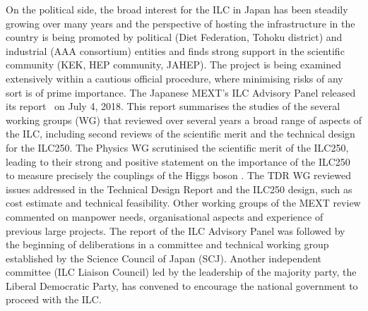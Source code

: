 \documentclass[%
 reprint,
 amsmath,amssymb,
 aps,
]{revtex4-1}
\newcommand{\todo}[1]{\textcolor{red}{{#1}}}
\begin{document}
On the political side, the broad interest for the ILC in Japan has been steadily growing over many years and the perspective of hosting the infrastructure in the country is being promoted by political (Diet Federation, Tohoku district) and industrial (AAA consortium) entities and finds strong support in the scientific community (KEK, HEP community, JAHEP). The project is being examined extensively within a cautious official procedure, where minimising risks of any sort is of prime importance. The Japanese MEXT's ILC Advisory Panel released its report~\cite{AdvPanel} on July 4, 2018.  This report summarises the studies of the several working groups (WG) that reviewed over several years a broad range of aspects of the ILC, including second reviews of the scientific merit and the technical design for the ILC250. 
The  Physics WG scrutinised the scientific merit of the ILC250, leading to their strong and positive statement on the importance of the ILC250 to measure precisely the couplings of the Higgs boson \cite{AdvPanel}.
The TDR WG reviewed issues addressed in the Technical Design Report and the ILC250 design, such as cost estimate and technical feasibility.  
Other working groups of the MEXT review commented on manpower needs, organisational aspects and experience of previous large projects.
The report of the ILC Advisory Panel was followed by the beginning of deliberations in a committee and technical working group established by the Science Council of Japan (SCJ).  Another independent committee (ILC Liaison Council) led by the leadership of the majority party, the Liberal Democratic Party, has convened to encourage the national government to proceed with the ILC.

\end{document}
